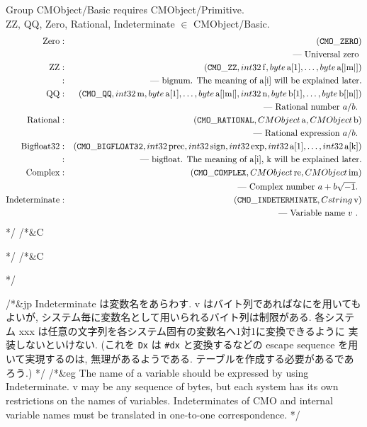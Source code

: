 \bigbreak
\noindent
Group CMObject/Basic requires CMObject/Primitive. \\
ZZ, QQ, Zero, Rational, Indeterminate $\in$ CMObject/Basic. \\
\begin{eqnarray*}
\mbox{Zero} &:& ({\tt CMO\_ZERO}) \\ 
& & \mbox{ --- Universal zero } \\
\mbox{ZZ}         &:& ({\tt CMO\_ZZ},{\sl int32}\, {\rm f}, {\sl byte}\, \mbox{a[1]}, \ldots ,
{\sl byte}\, \mbox{a[$|$m$|$]} ) \\
&:& \mbox{ --- bignum. The meaning of a[i] will be explained later.}\\
\mbox{QQ}        &:& ({\tt CMO\_QQ}, 
                      {\sl int32}\, {\rm m}, {\sl byte}\, \mbox{a[1]}, \ldots, {\sl byte}\, \mbox{a[$|$m$|$]},
                      {\sl int32}\, {\rm n}, {\sl byte}\, \mbox{b[1]}, \ldots, {\sl byte}\, \mbox{b[$|$n$|$]})\\
& & \mbox{ --- Rational number $a/b$. } \\
\mbox{Rational}        &:& ({\tt CMO\_RATIONAL}, {\sl CMObject}\, {\rm a}, {\sl CMObject}\, {\rm b}) \\
& & \mbox{ ---  Rational expression $a/b$. } \\
\mbox{Bigfloat32}         &:& ({\tt CMO\_BIGFLOAT32},
{\sl int32}\, {\rm prec}, {\sl int32}\, {\rm sign}, {\sl int32}\, {\rm exp}, 
{\sl int32}\, \mbox{a[1]}, \ldots , {\sl int32}\, \mbox{a[k]} ) \\
&:& \mbox{ --- bigfloat. The meaning of a[i], k will be explained later.}\\
\mbox{Complex}        &:& ({\tt CMO\_COMPLEX}, {\sl CMObject}\, {\rm re}, {\sl CMObject}\, {\rm im}) \\
& & \mbox{ ---  Complex number $a+b\sqrt{-1}$. } \\
\mbox{Indeterminate}        &:& ({\tt CMO\_INDETERMINATE}, {\sl Cstring}\, {\rm v}) \\
& & \mbox{ --- Variable name $v$ . } \\
\end{eqnarray*}
*/
/*&C

*/
/*&C

*/

/*&jp
Indeterminate は変数名をあらわす.
v はバイト列であればなにを用いてもよいが,
システム毎に変数名として用いられるバイト列は制限がある.
各システム xxx は任意の文字列を各システム固有の変数名へ1対1に変換できるように
実装しないといけない.
(これを
{\tt Dx} は {\tt \#dx} と変換するなどの
escape sequence を用いて実現するのは, 無理があるようである.
テーブルを作成する必要があるであろう.)
*/
/*&eg
The name of a variable should be expressed by using Indeterminate.
v may be any sequence of bytes, but each system has its own
restrictions on the names of variables.
Indeterminates of CMO and internal variable names must be translated
in one-to-one correspondence.
*/


